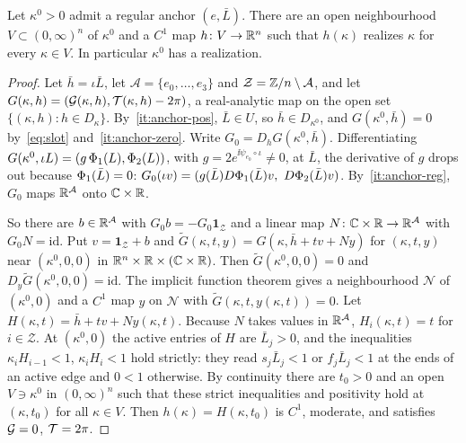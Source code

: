 \begin{theorem}\label{thm:anchor-realizes}
Let $\kappa^0>0$ admit a regular anchor $(e,\bar L)$. There are an open
neighbourhood $V\subset(0,\infty)^n$ of $\kappa^0$ and a $C^1$ map
$h\colon V\to\mathbb{R}^n$ such that $h(\kappa)$ realizes $\kappa$ for every
$\kappa\in V$. In particular $\kappa^0$ has a realization.
\end{theorem}

\begin{proof}
Let $\bar h=\iota\bar L$, let $\mathcal A=\{e_0,\dots,e_3\}$ and
$\mathcal Z=\mathbb{Z}/n\setminus\mathcal A$, and let
$G(\kappa,h)=(\mathcal{G}(\kappa,h),\mathcal{T}(\kappa,h)-2\pi)$, a real-analytic map on the
open set $\{(\kappa,h):h\in D_\kappa\}$. By~\ref{it:anchor-pos}, $\bar L\in U$,
so $\bar h\in D_{\kappa^0}$, and $G(\kappa^0,\bar h)=0$ by~\eqref{eq:slot}
and~\ref{it:anchor-zero}. Write $G_0=D_hG(\kappa^0,\bar h)$.
Differentiating $G(\kappa^0,\iota L)=(g\,\Phi_1(L),\Phi_2(L))$, with
$g=2e^{\ii\psi_{e_0}\circ\iota}\ne0$, at $\bar L$, the derivative of $g$ drops
out because $\Phi_1(\bar L)=0$:
$G_0(\iota v)=(g(\bar L)D\Ctrl_1(\bar L)v,\ D\Ctrl_2(\bar L)v)$. By~\ref{it:anchor-reg},
$G_0$ maps $\mathbb{R}^{\mathcal A}$ onto $\mathbb{C}\times\mathbb{R}$.

So there are $b\in\mathbb{R}^{\mathcal A}$ with $G_0b=-G_0\mathbf 1_{\mathcal Z}$ and a
linear map $N\colon\mathbb{C}\times\mathbb{R}\to\mathbb{R}^{\mathcal A}$ with $G_0N=\mathrm{id}$. Put
$v=\mathbf 1_{\mathcal Z}+b$ and $\widetilde G(\kappa,t,y)=G(\kappa,\bar h+tv+Ny)$ for
$(\kappa,t,y)$ near $(\kappa^0,0,0)$ in $\mathbb{R}^n\times\mathbb{R}\times(\mathbb{C}\times\mathbb{R})$. Then
$\widetilde G(\kappa^0,0,0)=0$ and $D_y\widetilde G(\kappa^0,0,0)=\mathrm{id}$. The implicit
function theorem gives a neighbourhood $\mathcal N$ of $(\kappa^0,0)$ and a
$C^1$ map $y$ on $\mathcal N$ with $\widetilde G(\kappa,t,y(\kappa,t))=0$. Let
$H(\kappa,t)=\bar h+tv+Ny(\kappa,t)$. Because $N$ takes values in
$\mathbb{R}^{\mathcal A}$, $H_i(\kappa,t)=t$ for $i\in\mathcal Z$. At $(\kappa^0,0)$
the active entries of $H$ are $\bar L_j>0$, and the inequalities
$\kappa_iH_{i-1}<1$, $\kappa_iH_i<1$ hold strictly: they read $s_j\bar L_j<1$
or $f_j\bar L_j<1$ at the ends of an active edge and $0<1$ otherwise. By
continuity there are $t_0>0$ and an open $V\ni\kappa^0$ in $(0,\infty)^n$
such that these strict inequalities and positivity hold at $(\kappa,t_0)$ for
all $\kappa\in V$. Then $h(\kappa)=H(\kappa,t_0)$ is $C^1$, moderate, and
satisfies $\mathcal{G}=0$, $\mathcal{T}=2\pi$.
\end{proof}

